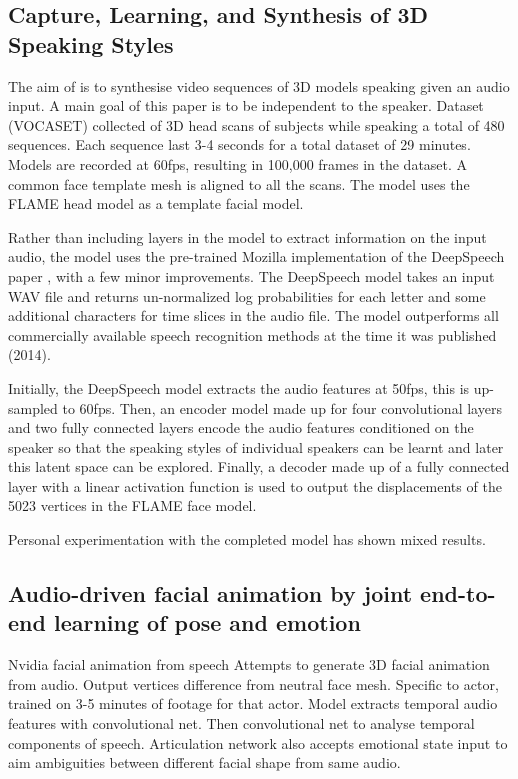 \documentclass[12pt]{article}
\begin{document}
\subsection{Capture, Learning, and Synthesis of {3D} Speaking Styles}
The aim of \cite{Cudeiro2019} is to synthesise video sequences of 3D models speaking given an audio input.
A main goal of this paper is to be independent to the speaker.
Dataset (VOCASET) collected of 3D head scans of subjects while speaking a total of 480 sequences.
Each sequence last 3-4 seconds for a total dataset of 29 minutes.
Models are recorded at 60fps, resulting in 100,000 frames in the dataset.
A common face template mesh is aligned to all the scans.
The model uses the FLAME head model \cite{Li2017} as a template facial model.

Rather than including layers in the model to extract information on the input audio, the model uses the pre-trained Mozilla implementation of the DeepSpeech paper \cite{Hannun2014}, with a few minor improvements.
The DeepSpeech model takes an input WAV file and returns un-normalized log probabilities for each letter and some additional characters for time slices in the audio file.
The model outperforms all commercially available speech recognition methods at the time it was published (2014).

Initially, the DeepSpeech model extracts the audio features at 50fps, this is up-sampled to 60fps.
Then, an encoder model made up for four convolutional layers and two fully connected layers encode the audio features conditioned on the speaker so that the speaking styles of individual speakers can be learnt and later this latent space can be explored. 
Finally, a decoder made up of a fully connected layer with a linear activation function is used to output the displacements of the 5023 vertices in the FLAME face model.

Personal experimentation with the completed model has shown mixed results.

\subsection{Audio-driven facial animation by joint end-to-end learning of pose and emotion}
Nvidia facial animation from speech \cite{Karras2017a}
Attempts to generate 3D facial animation from audio.
Output vertices difference from neutral face mesh.
Specific to actor, trained on 3-5 minutes of footage for that actor.
Model extracts temporal audio features with convolutional net.
Then convolutional net to analyse temporal components of speech.
Articulation network also accepts emotional state input to aim ambiguities between different facial shape from same audio.
\end{document}

